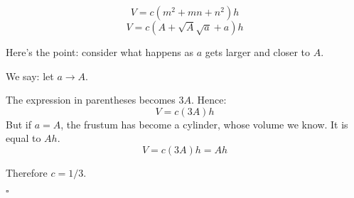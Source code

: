 \documentclass[11pt, oneside]{article}
\begin{document}
\[ V = c (m^2 + mn + n^2) h \]
\[ V = c (A + \sqrt{A} \sqrt{a} + a) h \]

Here's the point:  consider what happens as $a$ gets larger and closer to $A$.

We say:  let $a \rightarrow A$.

The expression in parentheses becomes $3A$.  Hence:
\[ V = c(3A)h \]
But if $a = A$, the frustum has become a cylinder, whose volume we know.  It is equal to $Ah$. 
\[ V = c(3A)h = Ah \]

Therefore $c = 1/3$.

$\square$
\end{document}
